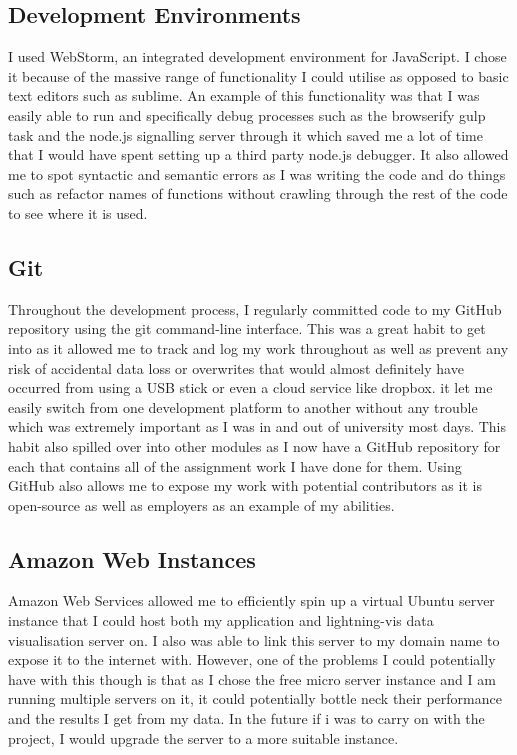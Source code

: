 \documentclass[]{report}
\begin{document}
			\subsection{Development Environments}
			I used WebStorm, an integrated development environment for JavaScript. I chose it because of the massive range of functionality I could utilise as opposed to basic text editors such as sublime. An example of this functionality was that I was easily able to run and specifically debug processes such as the browserify gulp task and the node.js signalling server through it which saved me a lot of time that I would have spent setting up a third party node.js debugger. It also allowed me to spot syntactic and semantic errors as I was writing the code and do things such as refactor names of functions without crawling through the rest of the code to see where it is used.
			
			\subsection{Git}
			Throughout the development process, I regularly committed code to my GitHub repository using the git command-line interface. This was a great habit to get into as it allowed me to track and log my work throughout as well as prevent any risk of accidental data loss or overwrites that would almost definitely have occurred from using a USB stick or even a cloud service like dropbox. it let me easily switch from one development platform to another without any trouble which was extremely important as I was in and out of university most days. This habit also spilled over into other modules as I now have a GitHub repository for each that contains all of the assignment work I have done for them. Using GitHub also allows me to expose my work with potential contributors as it is open-source as well as employers as an example of my abilities. 
			
			\subsection{Amazon Web Instances}
			Amazon Web Services allowed me to efficiently spin up a virtual Ubuntu server instance that I could host both my application and lightning-vis data visualisation server on. I also was able to link this server to my domain name to expose it to the internet with. However, one of the problems I could potentially have with this though is that as I chose the free micro server instance and I am running multiple servers on it, it could potentially bottle neck their performance and the results I get from my data. In the future if i was to carry on with the project, I would upgrade the server to a more suitable instance.
			
\end{document}
